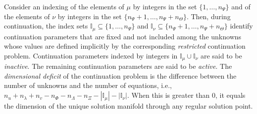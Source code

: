 Consider an indexing of the elements of $\mu$ by integers in the set $\{1,\ldots,n_\Psi\}$ and of the elements of $\nu$ by integers in the set $\{n_\Psi+1,\ldots,n_\Psi+n_\Theta\}$. Then, during continuation, the index sets $\mathbb{I}_\mu\subseteq\{1,\ldots,n_\Psi\}$ and $\mathbb{I}_\nu\subseteq\{n_\Psi+1,\ldots,n_\Psi+n_\Theta\}$ identify continuation parameters that are fixed and not included among the unknowns whose values are defined implicitly by the corresponding \emph{restricted} continuation problem. Continuation parameters indexed by integers in $\mathbb{I}_\mu\cup\mathbb{I}_\nu$ are said to be \emph{inactive}. The remaining continuation parameters are said to be \emph{active}. The \emph{dimensional deficit} of the continuation problem is the difference between the number of unknowns and the number of equations, i.e., $n_u+n_\lambda+n_v-n_\Phi-n_\Lambda-n_\Xi-\left|\mathbb{I}_\mu\right|-\left|\mathbb{I}_\nu\right|$. When this is greater than $0$, it equals the dimension of the unique solution manifold through any regular solution point.

